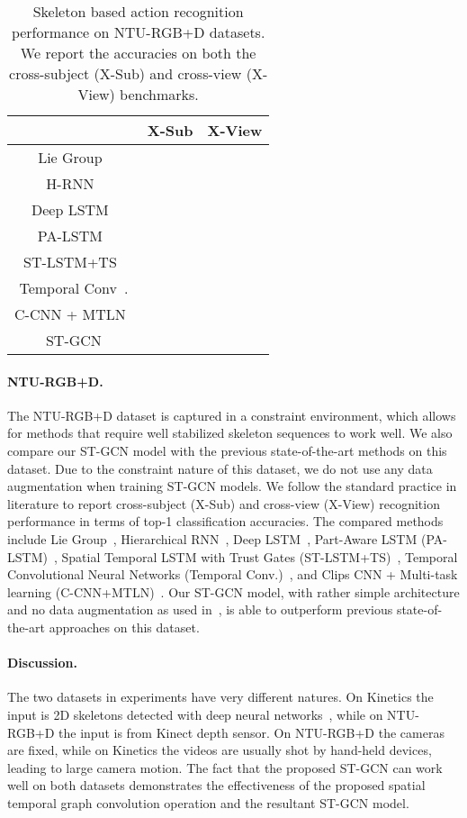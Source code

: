 \documentclass[letterpaper]{article} \usepackage{aaai18}  \usepackage{times}  \usepackage{helvet}  \usepackage{courier}  \usepackage{url}  \usepackage{graphicx}
\begin{document}
\begin{table}
	\small
	\centering
	\begin{tabular}{c|c|c}\hline
		& X-Sub& X-View \\ \hline
		Lie Group~\cite{Veeriah2015CVPR}		&  &  \\
		H-RNN~\cite{Du2015CVPR}		& &  \\
		Deep LSTM~\cite{Shahroudy2016CVPR}		& &  \\
		PA-LSTM~\cite{Shahroudy2016CVPR}			& &  \\
		ST-LSTM+TS~\cite{Liu2016ECCV}		& &  \\
		Temporal Conv~\cite{Kim2017CVPRW}.		&  &  \\
		C-CNN + MTLN~\cite{Ke2017CVPR}		& &  \\
		\hline
		ST-GCN 			&  &  \\\hline
	\end{tabular}
	\caption{Skeleton based action recognition performance on NTU-RGB+D datasets. We report the accuracies on both the cross-subject (X-Sub) and cross-view (X-View) benchmarks.}\label{tab:ntu}
\end{table}

\paragraph{NTU-RGB+D.}
The NTU-RGB+D dataset is captured in a constraint environment, which allows for methods that require well stabilized skeleton sequences to work well.
We also compare our ST-GCN model with the previous state-of-the-art methods on this dataset.
Due to the constraint nature of this dataset, we do not use any data augmentation when training ST-GCN models.
We follow the standard practice in literature to report cross-subject (X-Sub) and cross-view (X-View) recognition performance in terms of top-1 classification accuracies.
The compared methods include Lie Group~\cite{Veeriah2015CVPR}, Hierarchical RNN~\cite{Du2015CVPR}, Deep LSTM~\cite{Shahroudy2016CVPR}, Part-Aware LSTM (PA-LSTM)~\cite{Shahroudy2016CVPR}, Spatial Temporal LSTM with Trust Gates (ST-LSTM+TS)~\cite{Liu2016ECCV}, Temporal Convolutional Neural Networks (Temporal Conv.)~\cite{Kim2017CVPRW}, and Clips CNN + Multi-task learning (C-CNN+MTLN)~\cite{Ke2017CVPR}.
Our ST-GCN model, with rather simple architecture and no data augmentation as used in~\cite{Kim2017CVPRW,Ke2017CVPR}, is able to outperform previous state-of-the-art approaches on this dataset.

\paragraph{Discussion.}
The two datasets in experiments have very different natures. 
On Kinetics the input is 2D skeletons detected with deep neural networks~\cite{Cao2017CVPR}, while on NTU-RGB+D the input is from Kinect depth sensor.
On NTU-RGB+D the cameras are fixed, while on Kinetics the videos are usually shot by hand-held devices, leading to large camera motion.
The fact that the proposed ST-GCN can work well on both datasets demonstrates the effectiveness of the proposed spatial temporal graph convolution operation and the resultant ST-GCN model.
\end{document}
